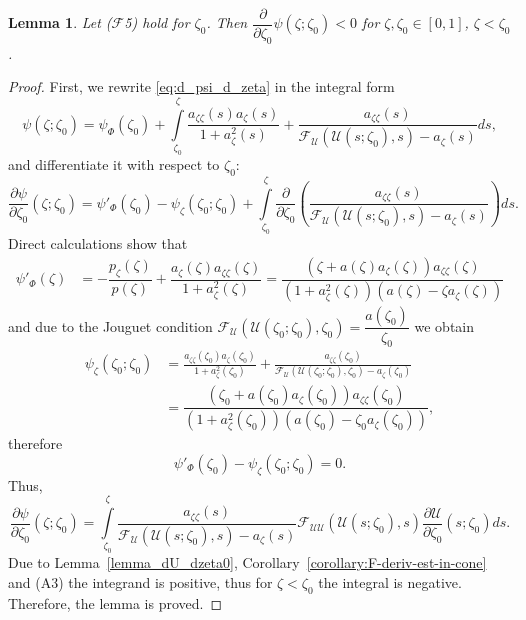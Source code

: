 \documentclass[12pt]{article}
\newtheorem{lemma}{Lemma}
\theoremstyle{definition}
\begin{document}
\begin{lemma} 
\label{lemma:dpsi_dzeta0}
Let ($\mathcal F$5) hold for $\zeta_0$. Then 
$\dfrac{\partial}{\partial\zeta_0}\psi(\zeta;\zeta_0) < 0$ for $\zeta, \zeta_0 \in [0,1]$, $\zeta < \zeta_0$.
\end{lemma}
\begin{proof}
First, we rewrite \eqref{eq:d_psi_d_zeta} in the integral form
    \[
    \psi(\zeta;\zeta_0) = \psi_\Phi(\zeta_0) + \int\limits_{\zeta_0}^\zeta\frac{a_{\zeta\zeta}(s) a_{\zeta}(s)}{1+ a_\zeta^2(s)} +
    \frac{a_{\zeta\zeta}(s)}{\mathcal F_{\mathcal U}(\mathcal U(s;\zeta_0), s) - a_\zeta(s)} ds,
    \]
and differentiate it with respect to $\zeta_0$:
    \[
    \frac{\partial \psi}{\partial\zeta_0}(\zeta;\zeta_0) = \psi'_\Phi(\zeta_0) - \psi_\zeta(\zeta_0;\zeta_0) + \int\limits_{\zeta_0}^\zeta \frac{\partial}{\partial \zeta_0}\left(\frac{a_{\zeta\zeta}(s)}{\mathcal F_{\mathcal U}(\mathcal U(s;\zeta_0), s) - a_\zeta(s)}\right) ds.
    \]
Direct calculations show that
    \begin{align*}
    \psi'_\Phi(\zeta) &= -\dfrac{p_\zeta(\zeta)}{p(\zeta)} + \dfrac{a_\zeta(\zeta)a_{\zeta\zeta}(\zeta)}{1 + a^2_\zeta(\zeta)} = 
        \dfrac{(\zeta + a(\zeta)a_\zeta(\zeta))a_{\zeta\zeta}(\zeta)}{(1 + a^2_\zeta(\zeta)) (a(\zeta)-\zeta a_\zeta(\zeta))}
    \end{align*}
and due to the Jouguet condition $\mathcal F_{\mathcal U}(\mathcal U(\zeta_0;\zeta_0), \zeta_0) = \dfrac{a(\zeta_0)}{\zeta_0}$ we obtain
    \begin{align*}
    \psi_\zeta(\zeta_0;\zeta_0) &= \frac{a_{\zeta\zeta}(\zeta_0) a_{\zeta}(\zeta_0)}{1+ a_\zeta^2(\zeta_0)} +
    \frac{a_{\zeta\zeta}(\zeta_0)}{\mathcal F_{\mathcal U}(\mathcal U(\zeta_0;\zeta_0), \zeta_0) - a_\zeta(\zeta_0)} \\
    {} &= \dfrac{(\zeta_0 + a(\zeta_0)a_\zeta(\zeta_0))a_{\zeta\zeta}(\zeta_0)}{(1+ a_\zeta^2(\zeta_0)) (a(\zeta_0)-\zeta_0 a_\zeta(\zeta_0))},
    \end{align*}
therefore 
\[
\psi'_\Phi(\zeta_0) -\psi_\zeta(\zeta_0;\zeta_0) = 0.
\]
Thus,
\[
\frac{\partial \psi}{\partial\zeta_0}(\zeta;\zeta_0) = 
\int\limits_{\zeta_0}^\zeta \frac{a_{\zeta\zeta}(s)}{\mathcal F_{\mathcal U}(\mathcal U(s;\zeta_0), s) - a_\zeta(s)}
\mathcal F_{\mathcal U\mathcal U}(\mathcal U(s;\zeta_0), s)\frac{\partial \mathcal U}{\partial\zeta_0} (s;\zeta_0)ds.
\]
Due to Lemma~\ref{lemma_dU_dzeta0}, Corollary~\ref{corollary:F-deriv-est-in-cone} and (A3) the integrand is positive, thus for $\zeta < \zeta_0$ the integral is negative.
Therefore, the lemma is proved.
\end{proof}
\end{document}
